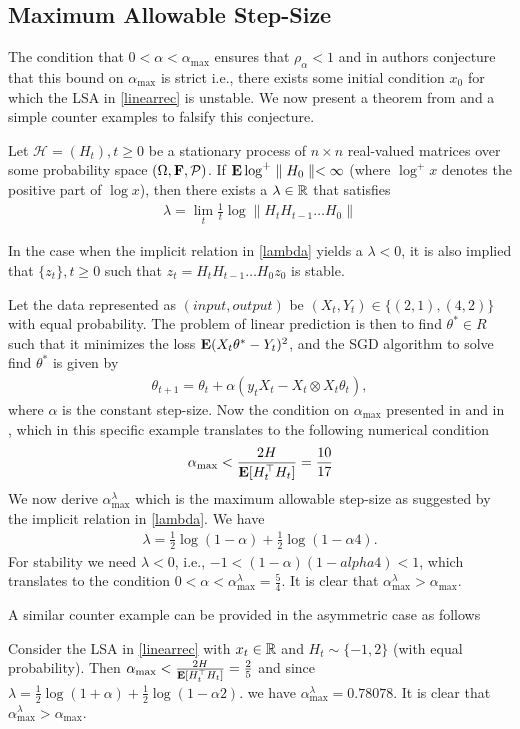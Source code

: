 \subsection{Maximum Allowable Step-Size}
The condition that $0<\alpha<\alpha_{\max}$ ensures that $\rho_{\alpha}<1$ and in \cite{} authors conjecture that this bound on $\alpha_{\max}$ is strict i.e., there exists some initial condition $x_0$ for which the LSA in \eqref{linearrec} is unstable. We now present a theorem from \cite{} and a simple counter examples to falsify this conjecture.
\begin{theorem}\label{explog}
Let $\mathcal{H}=(H_t), t\geq 0$ be a stationary process of $n\times n$ real-valued matrices over some probability space $(\Omega,\mathbf{F},\mathcal{P})$. If $\mathbf{E}\log^+\parallel H_0\parallel<\infty$ (where $\log^+ x$ denotes the positive part of $\log x$), then there exists a $\lambda\in \mathbb{R}$ that satisfies
\begin{align}\label{lambda}
\lambda=\lim_{t}\frac{1}{t}\log\parallel H_t H_{t-1}\ldots H_0\parallel
\end{align}
\end{theorem}
In the case when the implicit relation in \eqref{lambda} yields a $\lambda<0$, it is also implied that $\{z_t\},t\geq 0$ such that $z_t=H_t H_{t-1}\ldots H_0z_0$ is stable.
\begin{example}
Let the data represented as $(input,output)$ be $(X_t,Y_t)\in \{(2,1), (4,2)\}$ with equal probability. The problem of linear prediction is then to find $\theta^*\in R$ such that it minimizes the loss $\mathbf{E}(X_t \theta^* -Y_t)^2$, and the SGD algorithm to solve find $\theta^*$ is given by
\begin{align}
\theta_{t+1}=\theta_t+\alpha(y_t X_t-X_t\otimes X_t\theta_t),
\end{align}
where $\alpha$ is the constant step-size. Now the condition on $\alpha_{\max}$ presented in \Cref{} and in \cite{},  which in this specific example translates to the following numerical condition 
\begin{align*}
\alpha_{\max}<\frac{2H}{\mathbf{E}[H_t^\top H_t]}=\frac{10}{17}
\end{align*}
We now derive $\alpha^{\lambda}_{\max}$ which is the maximum allowable step-size as suggested by the implicit relation in \eqref{lambda}. We have
\begin{align}
\lambda=\frac{1}{2}\log(1-\alpha)+\frac{1}{2}\log(1-\alpha 4).
\end{align}
For stability we need $\lambda<0$, i.e., $-1<(1-\alpha)(1-alpha 4)<1$, which translates to the condition $0<\alpha<\alpha^{\lambda}_{\max}=\frac{5}{4}$. It is clear that $\alpha^{\lambda}_{\max}>\alpha_{\max}$.
\end{example}
A similar counter example can be provided in the asymmetric case as follows
\begin{example}
Consider the LSA in \eqref{linearrec} with $x_t\in \mathbb{R}$ and $H_t\sim \{-1, 2\}$ (with equal probability). Then 
$
\alpha_{\max}<\frac{2H}{\mathbf{E}[H_t^\top H_t]}=\frac{2}{5}
$
and since 
$
\lambda=\frac{1}{2}\log(1+\alpha)+\frac{1}{2}\log(1-\alpha 2).
$
we have $\alpha^{\lambda}_{\max}=0.78078$. It is clear that $\alpha^{\lambda}_{\max}>\alpha_{\max}$.
\end{example}


